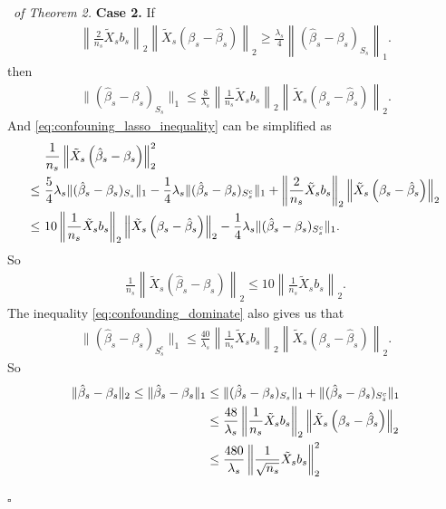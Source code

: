 \documentclass[12pt]{article}
\newenvironment{pf}{{\noindent \it Proof}\ }{\hfill $\square$\par}
\begin{document}
\begin{pf}{\it of Theorem 2. }
\textbf{Case 2.} If \begin{align*}
            \left\|\frac{2}{n_s}\tilde{X}_s b_s\right\|_2\left\|\tilde{X}_s\left(\beta_s - \hat{\beta}_s\right)\right\|_2 \ge \frac{\lambda_s}{4}\left\|(\hat{\beta}_s - \beta_s)_{S_s}\right\|_1.
        \end{align*}
        then 
        \begin{align*}
            \|(\hat{\beta}_s - \beta_s)_{S_s}\|_1 \le \frac{8}{\lambda_s}\left\|\frac{1}{n_s}\tilde{X}_s b_s\right\|_2\left\|\tilde{X}_s\left(\beta_s - \hat{\beta}_s\right)\right\|_2. 
        \end{align*}
        And \eqref{eq:confouning_lasso_inequality} can be simplified as 
        \begin{align}
             &\frac{1}{n_s}\left\|\tilde{X}_s\left(\hat{\beta}_s - \beta_s\right)\right\|_2^2 \notag\\\le \ &\frac{5}{4}\lambda_s\|(\hat{\beta}_s - \beta_s)_{S_s}\|_1 - \frac{1}{4}\lambda_s\|(\hat{\beta}_s - \beta_s)_{S_s^c}\|_1 +  \left\|\frac{2}{n_s}\tilde{X}_s b_s\right\|_2\left\|\tilde{X}_s\left(\beta_s - \hat{\beta}_s\right)\right\|_2\notag\\\le \ &
             10 \left\|\frac{1}{n_s}\tilde{X}_s b_s\right\|_2\left\|\tilde{X}_s\left(\beta_s - \hat{\beta}_s\right)\right\|_2- \frac{1}{4}\lambda_s\|(\hat{\beta}_s - \beta_s)_{S_s^c}\|_1. \label{eq:confounding_dominate}
        \end{align}
        So
        \begin{align*}
            \frac{1}{n_s}\left\|\tilde{X}_s\left(\hat{\beta}_s - \beta_s\right)\right\|_2 \le 10 \left\|\frac{1}{n_s}\tilde{X}_s b_s\right\|_2. 
        \end{align*}
        The inequality \eqref{eq:confounding_dominate} also gives us that
        \begin{align*}
            \|(\hat{\beta}_s - \beta_s)_{S_s^c}\|_1 \le \frac{40}{\lambda_s}\left\|\frac{1}{n_s}\tilde{X}_s b_s\right\|_2\left\|\tilde{X}_s\left(\beta_s - \hat{\beta}_s\right)\right\|_2. 
        \end{align*}
        So
        \begin{align}
        \label{eq:case2_error}
            \|\hat{\beta}_s - \beta_s\|_2 \le \|\hat{\beta}_s - \beta_s\|_1 &\le  \|(\hat{\beta}_s - \beta_s)_{S_s}\|_1 + \|(\hat{\beta}_s - \beta_s)_{S_s^c}\|_1\notag \\&   \le \frac{48}{\lambda_s}\left\|\frac{1}{n_s}\tilde{X}_s b_s\right\|_2\left\|\tilde{X}_s\left(\beta_s - \hat{\beta}_s\right)\right\|_2\notag\\& \le
            \frac{480}{\lambda_s}\left\|\frac{1}{\sqrt{n_s}}\tilde{X}_s b_s\right\|_2^2
        \end{align}


\end{pf}
\end{document}
